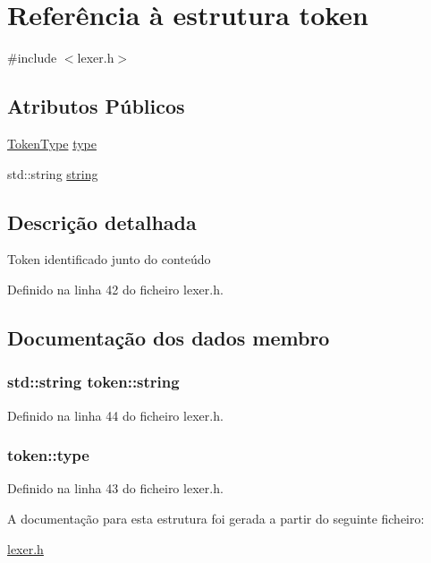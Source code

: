 \hypertarget{structtoken}{\section{Referência à estrutura token}
\label{structtoken}
}


{\ttfamily \#include $<$lexer.\-h$>$}

\subsection*{Atributos Públicos}
\begin{DoxyCompactItemize}
\item 
\hyperlink{lexer_8h_aa520fbf142ba1e7e659590c07da31921}{Token\-Type} \hyperlink{structtoken_a0ccfb094c0dce37e1bae7d990c06cc92}{type}
\item 
std\-::string \hyperlink{structtoken_a2150b4d92215b15d0c62c40cafd407ba}{string}
\end{DoxyCompactItemize}


\subsection{Descrição detalhada}
Token identificado junto do conteúdo 

Definido na linha 42 do ficheiro lexer.\-h.



\subsection{Documentação dos dados membro}
\hypertarget{structtoken_a2150b4d92215b15d0c62c40cafd407ba}{
\subsubsection[{string}]{\setlength{\rightskip}{0pt plus 5cm}std\-::string token\-::string}}\label{structtoken_a2150b4d92215b15d0c62c40cafd407ba}


Definido na linha 44 do ficheiro lexer.\-h.

\hypertarget{structtoken_a0ccfb094c0dce37e1bae7d990c06cc92}{
\subsubsection[{type}]{ token\-::type}}\label{structtoken_a0ccfb094c0dce37e1bae7d990c06cc92}


Definido na linha 43 do ficheiro lexer.\-h.



A documentação para esta estrutura foi gerada a partir do seguinte ficheiro\-:\begin{DoxyCompactItemize}
\item 
\hyperlink{lexer_8h}{lexer.\-h}\end{DoxyCompactItemize}
